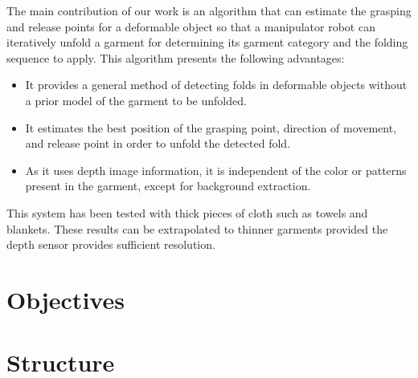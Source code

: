The main contribution of our work is an algorithm that can estimate the grasping and release points for a deformable object so that a manipulator robot can iteratively unfold a garment for determining its garment category and the folding sequence to apply.
This algorithm presents the following advantages:

\begin{itemize}
	\item It provides a general method of detecting folds in deformable objects without a prior model of the garment to be unfolded.
	\item It estimates the best position of the grasping point, direction of movement, and release point in order to unfold the detected fold.
	\item As it uses depth image information, it is independent of the color or patterns present in the garment, except for background extraction.
\end{itemize}

This system has been tested with thick pieces of cloth such as towels and blankets. These results can be extrapolated to thinner garments provided the depth sensor provides sufficient resolution.

\section{Objectives}
\label{intro_objectives}

\section{Structure}
\label{intro_structure}